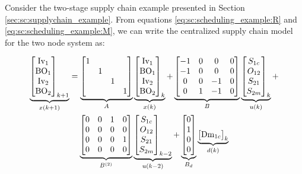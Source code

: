 Consider the two-stage supply chain example presented in Section
\ref{sec:sc:supplychain_example}. From equations
\eqref{eq:sc:scheduling_example:R} and \eqref{eq:sc:scheduling_example:M},
we can write the centralized supply chain model for the two node
system as:

\begin{multline}
\label{eq:esc:model0}
\underbrace{\begin{bmatrix}\textrm{Iv}_1\\\textrm{BO}_1\\\textrm{Iv}_2 \\
    \textrm{BO}_2\end{bmatrix}_{k+1}}_{x(k+1)} = 
\underbrace{\begin{bmatrix} 1 & & &
 \\ & 1 & &\\ & & 1 & \\ & & & 1\end{bmatrix}}_{A}
\underbrace{\begin{bmatrix}\textrm{Iv}_1\\\textrm{BO}_1\\\textrm{Iv}_2 \\
    \textrm{BO}_2\end{bmatrix}_{k}}_{x(k)}+
\underbrace{\begin{bmatrix}-1&0 &0 &0 \\-1&0 &0 &0 \\
0&0 & -1 &0 \\0 & 1 & -1 &0 \end{bmatrix}}_{B}
\underbrace{\begin{bmatrix}S_{1c}\\O_{12}\\S_{21}\\S_{2m}\end{bmatrix}_{k}}_{u(k)}+\\
\underbrace{\begin{bmatrix} 0&0 &1 &0 \\0 &0 &0 &0 \\
0&0 &0  &1 \\0 & 0 &0  &0 \end{bmatrix}}_{B^{(2)}}
\underbrace{\begin{bmatrix}S_{1c}\\O_{12}\\S_{21}\\S_{2m}\end{bmatrix}_{k-2}}_{u(k-2)}+
\underbrace{\begin{bmatrix}0 \\ 1 \\0 \\0 \end{bmatrix}}_{B_d}\underbrace{\begin{bmatrix}\textrm{Dm}_{1c}\end{bmatrix}_{k}}_{d(k)}
\end{multline}

